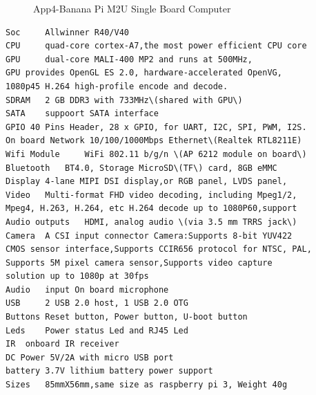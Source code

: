 \begin{figure}[htbp]
	\begin{center}
		\caption{App4-Banana Pi M2U Single Board Computer}
		\label{fig:App4-Banana-PI-M2U-SBC.jpg}
	\end{center}
\end{figure}

\lstset{basicstyle=\ttfamily\small}
\begin{lstlisting}[breaklines, frame=single, caption={App4-Specifications of Banana Pi M2U SBC Board}, label=App4-Specifications-of -Banana-Pi-M2U-SBC-Board]
Soc 	Allwinner R40/V40
CPU 	quad-core cortex-A7,the most power efficient CPU core 
GPU 	dual-core MALI-400 MP2 and runs at 500MHz, 
GPU provides OpenGL ES 2.0, hardware-accelerated OpenVG, 
1080p45 H.264 high-profile encode and decode.
SDRAM 	2 GB DDR3 with 733MHz\(shared with GPU\)
SATA 	suppoort SATA interface
GPIO 40 Pins Header, 28 x GPIO, for UART, I2C, SPI, PWM, I2S.
On board Network 10/100/1000Mbps Ethernet\(Realtek RTL8211E)
Wifi Module 	WiFi 802.11 b/g/n \(AP 6212 module on board\)
Bluetooth 	BT4.0, Storage MicroSD\(TF\) card, 8GB eMMC 
Display 4-lane MIPI DSI display,or RGB panel, LVDS panel,
Video 	Multi-format FHD video decoding, including Mpeg1/2, 
Mpeg4, H.263, H.264, etc H.264 decode up to 1080P60,support 
Audio outputs 	HDMI, analog audio \(via 3.5 mm TRRS jack\)
Camera 	A CSI input connector Camera:Supports 8-bit YUV422 
CMOS sensor interface,Supports CCIR656 protocol for NTSC, PAL,
Supports 5M pixel camera sensor,Supports video capture 
solution up to 1080p at 30fps
Audio 	input On board microphone
USB 	2 USB 2.0 host, 1 USB 2.0 OTG
Buttons Reset button, Power button, U-boot button
Leds 	Power status Led and RJ45 Led
IR	onboard IR receiver
DC Power 5V/2A with micro USB port
battery	3.7V lithium battery power support
Sizes	85mmX56mm,same size as raspberry pi 3, Weight 40g 
\end{lstlisting}


